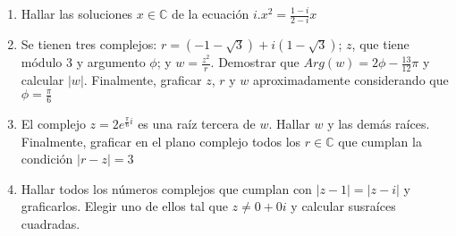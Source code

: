 \documentclass[a4paper]{article}
\newcommand{\df}[2]{\displaystyle\frac{#1}{#2}}
\begin{document}
\begin{enumerate}
\begin{enumerate} [label=(\alph*)]
		\item Hallar las soluciones $x \in \mathbb{C}$ de la ecuación $i.x^2=\df{1-i}{2-i}x$
		\item Se tienen tres complejos: $r=(-1-\sqrt{3})+i(1-\sqrt{3})$; $z$, que tiene módulo 3 y argumento $\phi$; y $w=\df{z^2}{r}$. Demostrar que $Arg(w)=2\phi-\df{13}{12}\pi$ y calcular $|w|$. Finalmente, graficar $z$, $r$ y $w$ aproximadamente considerando que $\phi=\df{\pi}{6}$
		\item El complejo $z=2e^{\frac{\pi}{6}i}$ es una raíz tercera de $w$. Hallar $w$ y las demás raíces. Finalmente, graficar en el plano complejo todos los $r\in\mathbb{C}$ que cumplan la condición $|r-z|=3$
		\item Hallar todos los números complejos que cumplan con $|z-1|=|z-i|$ y graficarlos. Elegir uno de ellos tal que $z\neq 0+0i$ y calcular susraíces cuadradas.
	\end{enumerate}
\end{enumerate}
\vspace{20pt} 
\end{document}

